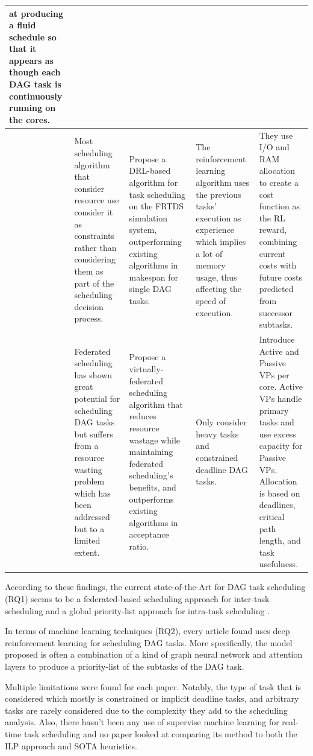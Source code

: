 \begin{table}
\begin{tabular}[]{|p{0.15in}|p{1.6in}|p{1.6in}|p{1.6in}|p{1.6in}|}
        at producing a fluid schedule so that it appears as though each DAG task
        is continuously running on the cores. \\
        \hline
        \cite{GuanFRTDS2020RL} & Most scheduling algorithm that consider
        resource use consider it as constraints rather than considering them 
        as part of the scheduling decision process. & Propose a DRL-based algorithm for task scheduling on the FRTDS simulation system, outperforming
         existing algorithms in makespan for single DAG tasks. & The reinforcement learning 
        algorithm uses the previous tasks' execution as experience
        which implies a lot of memory usage,
        thus affecting the speed of execution. & They use I/O and RAM allocation to create a cost function as the RL reward, combining current 
        costs with future costs predicted from successor subtasks. \\
        \hline
        \cite{JiangVirtuallyFederatedSched2021} & Federated scheduling 
        has shown great potential for scheduling DAG tasks but 
        suffers from a resource wasting problem which has 
        been addressed but to a limited extent. & Propose a virtually-federated scheduling algorithm that reduces 
        resource wastage while maintaining federated scheduling's benefits, and outperforms existing algorithms in acceptance ratio. 
        & Only consider heavy tasks and constrained deadline DAG tasks. 
        & Introduce Active and Passive VPs per core. Active VPs handle primary 
        tasks and use excess capacity for 
        Passive VPs. Allocation is based on deadlines, critical path length, and task usefulness.\\
        \hline
    \end{tabular}
\end{table}

According to these findings,
the current state-of-the-Art for DAG task scheduling (RQ1)
seems to be a federated-based scheduling approach for inter-task 
scheduling and a global priority-list approach for intra-task scheduling
\cite{He2023DegreeOfParallelism}\cite{Zhao2022DAGsched}.

In terms of machine learning techniques (RQ2), every article found uses 
deep reinforcement learning for scheduling DAG tasks.
More specifically, the model proposed is often a combination
of a kind of graph neural network and attention layers 
to produce a priority-list of the subtasks of the DAG task.

Multiple limitations were found for each 
paper. Notably, the type of task that is 
considered which mostly is constrained or implicit deadline tasks,
and arbitrary tasks are rarely considered due to the complexity they add
to the scheduling analysis.
Also, there hasn't been any use of supervise machine learning 
for real-time task scheduling
and no paper looked at comparing its method to both the ILP approach and SOTA heuristics.